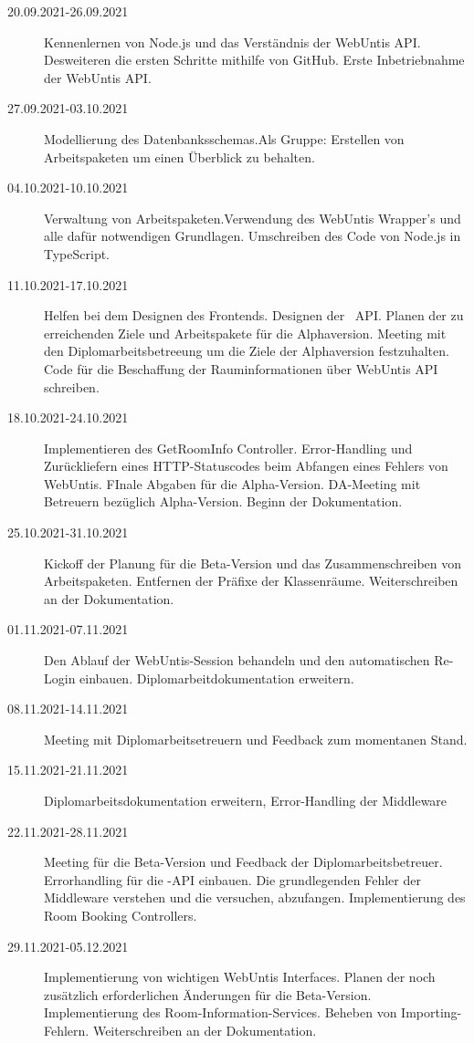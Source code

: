 
\begin{description}
    \item[20.09.2021-26.09.2021] Kennenlernen von Node.js und das Verständnis der WebUntis API. Desweiteren die ersten Schritte mithilfe von GitHub. Erste Inbetriebnahme der WebUntis API. 
    \item[27.09.2021-03.10.2021] Modellierung des Datenbanksschemas.Als Gruppe: Erstellen von Arbeitspaketen um einen Überblick zu behalten.
    \item[04.10.2021-10.10.2021] Verwaltung von Arbeitspaketen.Verwendung des WebUntis Wrapper's und alle dafür notwendigen Grundlagen. Umschreiben des Code von Node.js in TypeScript.
    \item[11.10.2021-17.10.2021] Helfen bei dem Designen des Frontends. Designen der \ZELIA\ API. Planen der zu erreichenden Ziele und Arbeitspakete für die Alphaversion. Meeting mit den Diplomarbeitsbetreeung um die Ziele der Alphaversion festzuhalten. Code für die Beschaffung der Rauminformationen über WebUntis API schreiben. 
    \item[18.10.2021-24.10.2021] Implementieren des GetRoomInfo Controller. Error-Hand\-ling und Zurückliefern eines HTTP-Statuscodes beim Abfangen eines Fehlers von WebUntis. FInale Abgaben für die Alpha-Version. DA-Meeting mit Betreuern bezüglich Alpha-Version. Beginn der Dokumentation.
    \item[25.10.2021-31.10.2021] Kickoff der Planung für die Beta-Version und das Zusammenschreiben von Arbeitspaketen. Entfernen der Präfixe der Klassenräume. Weiterschreiben an der Dokumentation.
    \item[01.11.2021-07.11.2021] Den Ablauf der WebUntis-Session behandeln und den automatischen Re-Login einbauen. Diplomarbeitdokumentation erweitern. 
    \item[08.11.2021-14.11.2021] Meeting mit Diplomarbeitsetreuern und Feedback zum momentanen Stand.
    \item[15.11.2021-21.11.2021] Diplomarbeitsdokumentation erweitern, Error-Handling der Middleware
    \item[22.11.2021-28.11.2021] Meeting für die Beta-Version und Feedback der Diplomarbeitsbetreuer. Errorhandling für die \ZELIA-API einbauen. Die grundlegenden Fehler der Middleware verstehen und die versuchen, abzufangen. Implementierung des Room Booking Controllers. 
    \item[29.11.2021-05.12.2021] Implementierung von wichtigen WebUntis Interfaces. Planen der noch zusätzlich erforderlichen Änderungen für die Beta-Version. Implementierung des Room-Information-Services. Beheben von Importing-Fehlern. Weiterschreiben an der Dokumentation.

\end{description}
